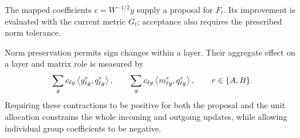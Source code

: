 The mapped coefficients $c=W^{-1/2}y$ supply a proposal for $F_t$.
Its improvement is evaluated with the current metric $G_t$;
acceptance also requires the prescribed norm tolerance.

Norm preservation permits sign changes within a layer. Their aggregate
effect on a layer and matrix role is measured by
\begin{equation}
 \sum_g c_{\ell g}\left\langle g_{\ell g}^r,q_{\ell g}^r\right\rangle,\qquad
 \sum_g c_{\ell g}\left\langle m_{\ell g}^r,q_{\ell g}^r\right\rangle,
 \qquad r\in\{A,B\}.
 \label{eq:transaction-contractions}
\end{equation}
Requiring these contractions to be positive for both the proposal and
the unit allocation constrains the whole incoming and outgoing updates,
while allowing individual group coefficients to be negative.
